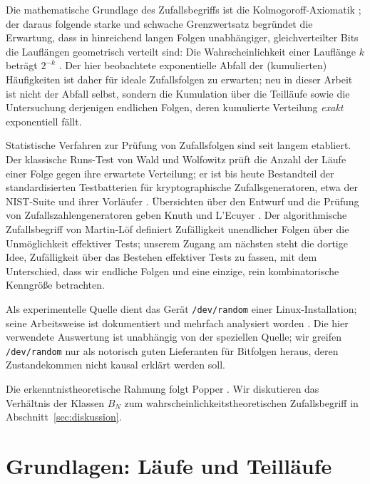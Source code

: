 \documentclass[11pt,a4paper]{scrartcl}
\theoremstyle{plain}
\theoremstyle{definition}
\theoremstyle{remark}
\begin{document}
Die mathematische Grundlage des Zufallsbegriffs ist die
Kolmogoroff-Axiomatik \cite{kolmogoroff1933}; der daraus folgende
starke und schwache Grenzwertsatz begründet die Erwartung, dass in
hinreichend langen Folgen unabhängiger, gleichverteilter Bits die
Lauflängen geometrisch verteilt sind: Die Wahrscheinlichkeit einer
Lauflänge $k$ beträgt $2^{-k}$ \cite[und dortige Übungsaufgaben zu Runs]{feller1968}.
Der hier beobachtete exponentielle Abfall der (kumulierten)
Häufigkeiten ist daher für ideale Zufallsfolgen zu erwarten; neu in
dieser Arbeit ist nicht der Abfall selbst, sondern die Kumulation über
die Teilläufe sowie die Untersuchung derjenigen endlichen Folgen, deren
kumulierte Verteilung \emph{exakt} exponentiell fällt.

Statistische Verfahren zur Prüfung von Zufallsfolgen sind seit langem
etabliert. Der klassische Runs-Test von Wald und Wolfowitz
\cite{waldwolfowitz1940} prüft die Anzahl der Läufe einer Folge gegen
ihre erwartete Verteilung; er ist bis heute Bestandteil der
standardisierten Testbatterien für kryptographische Zufallsgeneratoren,
etwa der NIST-Suite \cite{rukhin2010nist} und ihrer Vorläufer
\cite{knuth1997,marsaglia1996}. Übersichten über den Entwurf und die
Prüfung von Zufallszahlengeneratoren geben Knuth \cite{knuth1997} und
L'Ecuyer \cite{lecuyer1994}. Der algorithmische Zufallsbegriff von
Martin-Löf \cite{martinloef1966} definiert Zufälligkeit unendlicher
Folgen über die Unmöglichkeit effektiver Tests; unserem Zugang am
nächsten steht die dortige Idee, Zufälligkeit über das Bestehen
effektiver Tests zu fassen, mit dem Unterschied, dass wir endliche
Folgen und eine einzige, rein kombinatorische Kenngröße betrachten.

Als experimentelle Quelle dient das Gerät \texttt{/dev/random} einer
Linux-Installation; seine Arbeitsweise ist dokumentiert und mehrfach
analysiert worden \cite{gutterman2004}. Die hier verwendete
Auswertung ist unabhängig von der speziellen Quelle; wir greifen
\texttt{/dev/random} nur als notorisch guten Lieferanten für Bitfolgen
heraus, deren Zustandekommen nicht kausal erklärt werden soll.

Die erkenntnistheoretische Rahmung folgt Popper \cite{popper1935}.
Wir diskutieren das Verhältnis der Klassen $B_N$ zum
wahrscheinlichkeitstheoretischen Zufallsbegriff in
Abschnitt~\ref{sec:diskussion}.

\section{Grundlagen: Läufe und Teilläufe}\label{sec:grundlagen}
\end{document}
